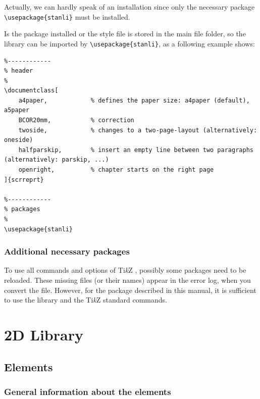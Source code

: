 \documentclass[%
  a4paper,
  BCOR=20mm,
  numbers=noenddot,
  twoside,
  parskip=half,
  openright,
  version=last,
]{scrreprt}
\newcommand{\tikzsym}{Ti\emph{k}Z }
\begin{document}
Actually, we can hardly speak of an installation since only the necessary package \lstinline|\usepackage{stanli}| must be installed.

Is the package installed or the style file is stored in the main file folder, so the library can be imported by \lstinline|\usepackage{stanli}|, as a following example shows:

\begin{lstlisting}
%------------
% header
%	
\documentclass[
	a4paper,            % defines the paper size: a4paper (default), a5paper
	BCOR20mm,           % correction
	twoside,            % changes to a two-page-layout (alternatively: oneside)
	halfparskip,        % insert an empty line between two paragraphs (alternatively: parskip, ...)
	openright,          % chapter starts on the right page
]{scrreprt}

%------------
% packages
%
\usepackage{stanli}
\end{lstlisting}

\section{Additional necessary packages}
\label{sec:WeitereNotwendigePackages}

To use all commands and options of \tikzsym, possibly some packages need to be reloaded. These missing files (or their names) appear in the error log, when you convert the file. However, for the package described in this manual, it is sufficient to use the library and the \tikzsym standard commands.


\part{2D Library}
\label{part:2dlib}



\chapter{Elements}
\label{sec:Elemente}


\section{General information about the elements}
\label{sec:AllgemeinesZuDenElementen}
\end{document}
